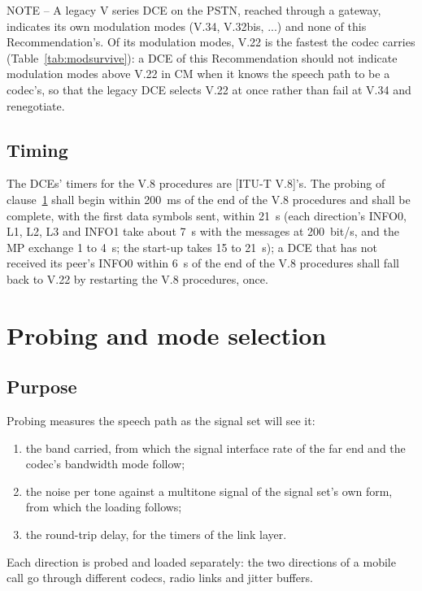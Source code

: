 \documentclass[a4paper,11pt]{article}
\newcommand{\itunote}[1]{\par{\small NOTE -- #1}\par}
\newcommand{\rec}[1]{[ITU-T #1]}
\begin{document}
\itunote{A legacy V series DCE on the PSTN, reached through a gateway,
indicates its own modulation modes (V.34, V.32bis, ...) and none of this
Recommendation's.  Of its modulation modes, V.22 is the fastest the
codec carries (Table~\ref{tab:modsurvive}): a DCE of this Recommendation
should not indicate modulation modes above V.22 in CM when it knows the
speech path to be a codec's, so that the legacy DCE selects V.22 at once
rather than fail at V.34 and renegotiate.}

\subsection{Timing}
The DCEs' timers for the V.8 procedures are \rec{V.8}'s.  The probing of
clause~\ref{sec:probing} shall begin within 200~ms of the end of the V.8
procedures and shall be complete, with the first data symbols sent,
within 21~s (each direction's INFO0, L1, L2, L3 and INFO1 take about 7~s
with the messages at 200~bit/s, and the MP exchange 1 to 4~s; the
start-up takes 15 to 21~s); a DCE that has not received its peer's
INFO0 within 6~s of the end of the V.8 procedures shall fall back to
V.22 by restarting the V.8 procedures, once.

\section{Probing and mode selection}\label{sec:probing}
\subsection{Purpose}
Probing measures the speech path as the signal set will see it:
\begin{enumerate}[label=\alph*)]
\item the band carried, from which the signal interface rate of the far
  end and the codec's bandwidth mode follow;
\item the noise per tone against a multitone signal of the signal set's
  own form, from which the loading follows;
\item the round-trip delay, for the timers of the link layer.
\end{enumerate}
Each direction is probed and loaded separately: the two directions of a
mobile call go through different codecs, radio links and jitter buffers.
\end{document}
